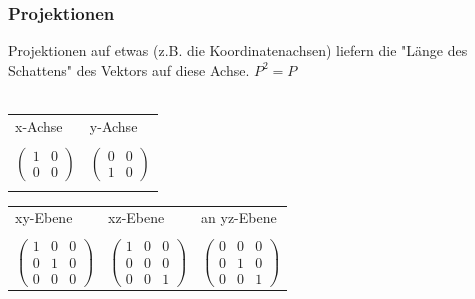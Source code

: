 			\subsubsection{Projektionen}		
			Projektionen auf etwas (z.B. die Koordinatenachsen) liefern die "Länge des Schattens" des Vektors auf diese Achse. \qquad $P^2 = P$ \\
			\\
			\begin{tabular}{ll}
		  	x-Achse & y-Achse \\
		  	\\
		  	$\begin{pmatrix} 1 & 0  \\ 0 & 0  \end{pmatrix}$ & $\begin{pmatrix} 0 & 0  \\ 1 & 0  \end{pmatrix}$  \\
		  	\\
		  	\end{tabular}				
			
			\begin{tabular}{lll}
		  	xy-Ebene & xz-Ebene & an yz-Ebene\\
		  	\\
		  	$\begin{pmatrix} 1 & 0 & 0 \\ 0 & 1 & 0 \\ 0 & 0 & 0 \end{pmatrix}$ & $\begin{pmatrix} 1 & 0 & 0 \\ 0 & 0 & 0 \\ 0 & 0 & 1 \end{pmatrix}$ & $\begin{pmatrix} 0 & 0 & 0 \\ 0 & 1 & 0 \\ 0 & 0 & 1 \end{pmatrix}$ \\
		  	\end{tabular}		  	
		  	
